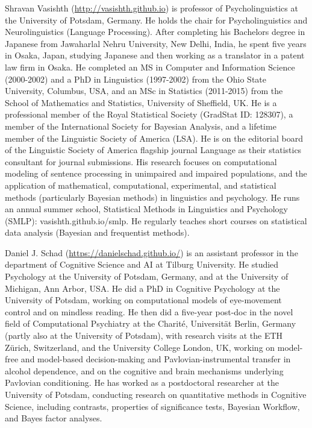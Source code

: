 \documentclass[12pt,]{krantz}
\begin{document}
Shravan Vasishth (\url{http://vasishth.github.io}) is professor of Psycholinguistics at the University of Potsdam, Germany. He holds the chair for Psycholinguistics and Neurolinguistics (Language Processing). After completing his Bachelors degree in Japanese from Jawaharlal Nehru University, New Delhi, India, he spent five years in Osaka, Japan, studying Japanese and then working as a translator in a patent law firm in Osaka. He completed an MS in Computer and Information Science (2000-2002) and a PhD in Linguistics (1997-2002) from the Ohio State University, Columbus, USA, and an MSc in Statistics (2011-2015) from the School of Mathematics and Statistics, University of Sheffield, UK. He is a professional member of the Royal Statistical Society (GradStat ID: 128307), a member of the International Society for Bayesian Analysis, and a lifetime member of the Linguistic Society of America (LSA). He is on the editorial board of the Linguistic Society of America flagship journal Language as their statistics consultant for journal submissions. His research focuses on computational modeling of sentence processing in unimpaired and impaired populations, and the application of mathematical, computational, experimental, and statistical methods (particularly Bayesian methods) in linguistics and psychology. He runs an annual summer school, Statistical Methods in Linguistics and Psychology (SMLP): vasishth.github.io/smlp. He regularly teaches short courses on statistical data analysis (Bayesian and frequentist methods).

Daniel J. Schad (\url{https://danielschad.github.io/}) is an assistant professor in the department of Cognitive Science and AI at Tilburg University. He studied Psychology at the University of Potsdam, Germany, and at the University of Michigan, Ann Arbor, USA. He did a PhD in Cognitive Psychology at the University of Potsdam, working on computational models of eye-movement control and on mindless reading. He then did a five-year post-doc in the novel field of Computational Psychiatry at the Charité, Universität Berlin, Germany (partly also at the University of Potsdam), with research visits at the ETH Zürich, Switzerland, and the University College London, UK, working on model-free and model-based decision-making and Pavlovian-instrumental transfer in alcohol dependence, and on the cognitive and brain mechanisms underlying Pavlovian conditioning. He has worked as a postdoctoral researcher at the University of Potsdam, conducting research on quantitative methods in Cognitive Science, including contrasts, properties of significance tests, Bayesian Workflow, and Bayes factor analyses.
\end{document}
